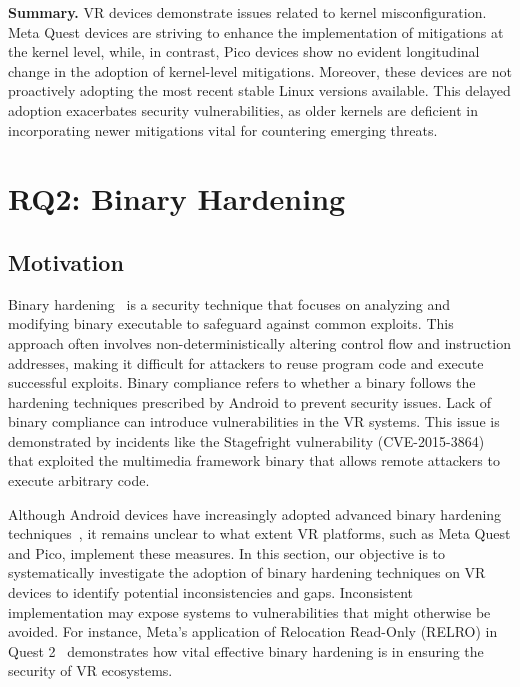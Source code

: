 \documentclass[sigconf]{acmart}
\begin{document}
\begin{mdframed}[
  roundcorner=5pt,   linewidth=0.8pt,   linecolor=black,   backgroundcolor=gray!10,
  innertopmargin=4pt,innerbottommargin=4pt,
  innerleftmargin=4pt,
  innerrightmargin=4pt
]
\textbf{Summary.}  
VR devices demonstrate issues related to kernel misconfiguration. Meta Quest devices are striving to enhance the implementation of mitigations at the kernel level, while, in contrast, Pico devices show no evident longitudinal change in the adoption of kernel-level mitigations. Moreover, these devices are not proactively adopting the most recent stable Linux versions available. This delayed adoption exacerbates security vulnerabilities, as older kernels are deficient in incorporating newer mitigations vital for countering emerging threats.
\end{mdframed}

\section{RQ2: Binary Hardening}
\label{s:rq2}

\subsection{Motivation}
Binary hardening~\cite{wikipediaHardeningcomputing} is a security technique that focuses on analyzing and modifying binary executable to safeguard against common exploits. 
This approach often involves non-deterministically altering control flow and instruction addresses, making it difficult for attackers to reuse program code and execute successful exploits. 
Binary compliance refers to whether a binary follows the hardening techniques prescribed by Android to prevent security issues. 
Lack of binary compliance can introduce vulnerabilities in the VR systems. This issue is demonstrated by incidents like the Stagefright vulnerability (CVE-2015-3864) \cite{CVE-2015-3864}  that exploited the multimedia framework binary that allows remote attackers to execute arbitrary code. 

Although Android devices have increasingly adopted advanced binary hardening techniques~\cite{possemato2021trust}, it remains unclear to what extent VR platforms, such as Meta Quest and Pico, implement these measures. 
In this section, our objective is to systematically investigate the adoption of binary hardening techniques on VR devices to identify potential inconsistencies and gaps. 
Inconsistent implementation may expose systems to vulnerabilities that might otherwise be avoided. For instance, Meta's application of Relocation Read-Only (RELRO) in Quest 2~\cite{quest-blog} demonstrates how vital effective binary hardening is in ensuring the security of VR ecosystems.
\end{document}
